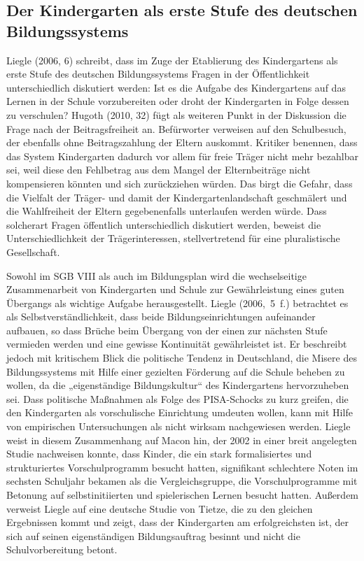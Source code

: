 \subsection{Der Kindergarten als erste Stufe des deutschen Bildungssystems}
Liegle (2006, 6) schreibt, dass im Zuge der Etablierung des Kindergartens als erste Stufe des deutschen Bildungssystems Fragen in der Öffentlichkeit unterschiedlich diskutiert werden: Ist es die Aufgabe des Kindergartens auf das Lernen in der Schule vorzubereiten oder droht der Kindergarten in Folge dessen zu verschulen? Hugoth (2010, 32) fügt als weiteren Punkt in der Diskussion die Frage nach der Beitragsfreiheit an. Befürworter verweisen auf den Schulbesuch, der ebenfalls ohne Beitragszahlung der Eltern auskommt. Kritiker benennen, dass das System Kindergarten dadurch vor allem für freie Träger nicht mehr bezahlbar sei, weil diese den Fehlbetrag aus dem Mangel der Elternbeiträge nicht kompensieren könnten und sich zurückziehen würden. Das birgt die Gefahr, dass die Vielfalt der Träger- und damit der Kindergartenlandschaft geschmälert und die Wahlfreiheit der Eltern gegebenenfalls unterlaufen werden würde. Dass solcherart Fragen öffentlich unterschiedlich diskutiert werden, beweist die Unterschiedlichkeit der Trägerinteressen, stellvertretend für eine pluralistische Gesellschaft. 

Sowohl im SGB VIII als auch im Bildungsplan wird die wechselseitige Zusammenarbeit von Kindergarten und Schule zur Gewährleistung eines guten Übergangs als wichtige Aufgabe herausgestellt. Liegle (2006,~5~f.) betrachtet es als Selbstverständlichkeit, dass beide Bildungseinrichtungen aufeinander aufbauen, so dass Brüche beim Übergang von der einen zur nächsten Stufe vermieden werden und eine gewisse Kontinuität gewährleistet ist. Er beschreibt jedoch mit kritischem Blick die politische Tendenz in Deutschland, die Misere des Bildungssystems mit Hilfe einer gezielten Förderung auf die Schule  beheben zu wollen, da die „eigenständige Bildungskultur“ des Kindergartens hervorzuheben sei.
Dass politische Maßnahmen als Folge des PISA-Schocks zu kurz greifen, die den Kindergarten als vorschulische Einrichtung umdeuten wollen, kann mit Hilfe von empirischen Untersuchungen als nicht wirksam nachgewiesen werden. Liegle weist in diesem Zusammenhang auf Macon hin, der 2002 in einer breit angelegten Studie nachweisen konnte, dass Kinder, die ein stark formalisiertes und strukturiertes Vorschulprogramm besucht hatten, signifikant schlechtere Noten im sechsten Schuljahr bekamen als die Vergleichsgruppe, die Vorschulprogramme mit Betonung auf selbstinitiierten und spielerischen Lernen besucht hatten. Außerdem verweist Liegle auf eine deutsche Studie von Tietze, die zu den gleichen Ergebnissen kommt und zeigt, dass der Kindergarten am erfolgreichsten ist, der sich auf seinen eigenständigen Bildungsauftrag besinnt und nicht die Schulvorbereitung betont.

